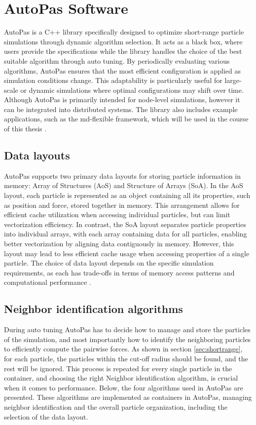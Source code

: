 \section{AutoPas Software}

AutoPas is a C++ library specifically designed to optimize short-range particle simulations through dynamic algorithm selection. It acts as a black box, where users provide the specifications while the library handles the choice of the best suitable algorithm through auto tuning. By periodically evaluating various algorithms, AutoPas ensures that the most efficient configuration is applied as simulation conditions change. This adaptability is particularly useful for large-scale or dynamic simulations where optimal configurations may shift over time. Although AutoPas is primarily intended for node-level simulations, however it can be integrated into distributed systems. The library also includes example applications, such as the md-flexible framework, which will be used in the course of this thesis \parencite{gratl2019autopas}.


\subsection{Data layouts}

AutoPas supports two primary data layouts for storing particle information in memory: Array of Structures (AoS) and Structure of Arrays (SoA). In the AoS layout, each particle is represented as an object containing all its properties, such as position and force, stored together in memory. This arrangement allows for efficient cache utilization when accessing individual particles, but can limit vectorization efficiency. In contrast, the SoA layout separates particle properties into individual arrays, with each array containing data for all particles, enabling better vectorization by aligning data contiguously in memory. However, this layout may lead to less efficient cache usage when accessing properties of a single particle. The choice of data layout depends on the specific simulation requirements, as each has trade-offs in terms of memory access patterns and computational performance \parencite{gratl2019autopas}.

\subsection{Neighbor identification algorithms}

During auto tuning AutoPas has to decide how to manage and store the particles of the simulation, and most importantly how to identify the neighboring particles to efficiently compute the pairwise forces. As shown in section \ref{sec:shortrange}, for each particle, the particles within the cut-off radius should be found, and the rest will be ignored. This process is repeated for every single particle in the container, and choosing the right Neighbor identification algorithm, is crucial when it comes to performance. Below, the four algorithms used in AutoPas are presented. These algorithms are implemented as containers in AutoPas, managing neighbor identification and the overall particle organization, including the selection of the data layout. 

